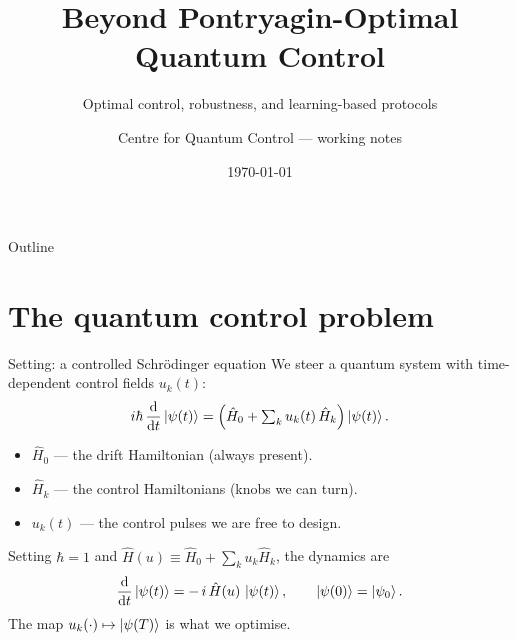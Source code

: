 \documentclass[10pt,aspectratio=169]{beamer}
\title{Beyond Pontryagin-Optimal Quantum Control}
\subtitle{Optimal control, robustness, and learning-based protocols}
\date{\today}
\author{Centre for Quantum Control --- working notes}
\institute{Optimal control theory $\cdot$ Reinforcement learning $\cdot$ Many-body physics}
\newcommand{\Hop}{\hat H}
\newcommand{\dt}{\frac{\dd}{\dd t}}
\newcommand{\psit}{\ket{\psi(t)}}
\begin{document}
\maketitle

\begin{frame}{Outline}
  \tableofcontents
\end{frame}

\section{The quantum control problem}

\begin{frame}{Setting: a controlled Schr\"odinger equation}
  We steer a quantum system with time-dependent control fields $u_k(t)$:
  \begin{equation}
    i\hbar\,\dt\psit
      = \Big(\Hop_0 + \textstyle\sum_k u_k(t)\,\Hop_k\Big)\psit .
    \label{eq:tdse}
  \end{equation}
  \begin{itemize}
    \item $\Hop_0$ --- the \alert{drift} Hamiltonian (always present).
    \item $\Hop_k$ --- the \alert{control} Hamiltonians (knobs we can turn).
    \item $u_k(t)$ --- the control \alert{pulses} we are free to design.
  \end{itemize}
  \vspace{0.5em}
  Setting $\hbar=1$ and $\Hop(u)\equiv \Hop_0+\sum_k u_k\Hop_k$, the dynamics are
  \begin{equation}
    \dt\psit = -\,i\,\Hop(u)\,\psit ,
    \qquad \ket{\psi(0)}=\ket{\psi_0}.
  \end{equation}
  The map $u_k(\cdot)\mapsto \ket{\psi(T)}$ is what we optimise.
\end{frame}
\end{document}
